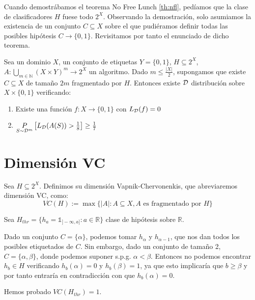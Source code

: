 Cuando demostrábamos el teorema No Free Lunch \ref{th:nfl}, pedíamos que la clase de clasificadores $H$ fuese todo $2^X$. 
Observando la demostración, solo asumiamos la existencia de un conjunto $C\subseteq X$ sobre el que pudiéramos definir 
todas las posibles hipótesis $C \rightarrow \{0,1\}$. Revisitamos por tanto el enunciado de dicho teorema.

\begin{theorem}
Sea un dominio $X$, un conjunto de etiquetas $Y=\{0,1\}$, $H \subseteq 2^X$, 
$A: \underset{m\in \mathbb{N}}{\bigcup} (X\times Y)^m \rightarrow 2^X$ un algoritmo. Dado $m \le \frac{|X|}{2}$,
supongamos que existe $C\subseteq X$ de tamaño $2m$ fragmentado por $H$. Entonces existe $\mathcal{D}$ distribución sobre 
$X\times \{0,1\}$ verificando:
\begin{enumerate}[i]
\item Existe una función $f: X \rightarrow \{0,1\}$ con $L_{\mathcal{D}}(f)=0$
\item $\underset{S\sim \mathcal{D}^m}{P} \left[ L_{\mathcal{D}}(A(S)) > \frac{1}{8} \right] \ge \frac{1}{7}$
\end{enumerate}

\label{th:nfl2}
\end{theorem}


\section{Dimensión VC}
\begin{definition}[Dimensión VC]
Sea $H \subseteq 2^X$. Definimos su dimensión Vapnik-Chervonenkis, que abreviaremos dimensión VC, como:
\[
  VC(H) := \max \{|A| : A\subseteq X, A \textrm{ es fragmentado por } H\}
\]
\end{definition}


\begin{example}
Sea $H_{thr} = \{h_a = \mathds{1}_{]-\infty, a]}: a\in \mathbb{R}\}$ clase de hipótesis sobre $\mathbb{R}$. 

Dado un conjunto $C=\{\alpha\}$, podemos tomar $h_{\alpha}$ y $h_{\alpha-1}$, que nos dan todos los posibles etiquetados de
$C$. Sin embargo, dado un conjunto de tamaño 2, $C=\{\alpha, \beta\}$, donde podemos suponer s.p.g. $\alpha < \beta$. 
Entonces no podemos encontrar $h_b \in H$ verificando $h_b(\alpha)=0$ y $h_b(\beta) = 1$, ya que esto implicaría que 
$b \ge \beta$ y por tanto entraría en contradicción con que $h_b(\alpha) = 0$.

Hemos probado $VC(H_{thr}) = 1$.
\end{example}


